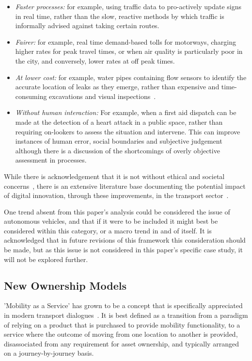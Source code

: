 \documentclass[journal]{IEEEtran}
\begin{document}
\begin{itemize}
\item {\emph{Faster processes:}} for example, using traffic data to
pro-actively update signs in real time, rather than the slow, reactive
methods by which traffic is informally advised against taking certain
routes.
\item {\emph{Fairer:}} for example, real time demand-based tolls for
motorways, charging higher rates for peak travel times, or when air
quality is particularly poor in the city, and conversely, lower rates
at off peak times.
\item {\emph{At lower cost:}} for example, water pipes containing flow
sensors to identify the accurate location of leaks as they emerge,
rather than expensive and time-consuming excavations and visual
inspections~\cite{cosgrave-et-al:2014}.
\item {\emph{Without human interaction:}} For example, when a first
aid dispatch can be made at the detection of a heart attack in a
public space, rather than requiring on-lookers to assess the situation
and intervene. This can improve instances of human error, social
boundaries and subjective judgement although there is a discussion of
the shortcomings of overly objective assessment in processes.
\end{itemize}

While there is acknowledgement that it is not without ethical and
societal concerns~\cite{bimber:1990,oatley-et-al_dasc:2015}, there is
an extensive literature base documenting the potential impact of
digital innovation, through these improvements, in the transport
sector~\cite{enoch:2015}.

One trend absent from this paper's analysis could be considered the issue of autonomous vehicles, and that if it were to be included it might best be considered within this category, or a macro trend in and of itself. It is acknowledged that in future revisions of this framework this consideration should be made, but as this issue is not considered in this paper's specific case study, it will not be explored further. 


\subsection{New Ownership Models}

'Mobility as a Service' has grown to be a concept that is specifically
appreciated in modern transport dialogues~\cite{tscatapult:2016}. It
is best defined as a transition from a paradigm of relying on a
product that is purchased to provide mobility functionality, to a
service where the outcome of moving from one location to another is
provided, disassociated from any requirement for asset ownership, and
typically arranged on a journey-by-journey basis.
\end{document}
